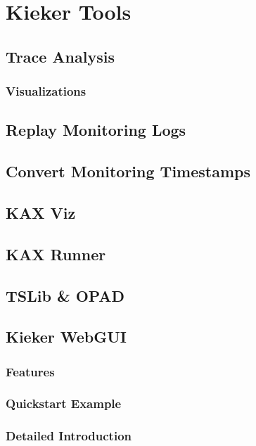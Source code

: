 \chapter{Kieker Tools}\label{chp:Kieker-Tools}
	\section{Trace Analysis}
		\subsection{Visualizations}
	\section{Replay Monitoring Logs}
	\section{Convert Monitoring Timestamps}
	\section{KAX Viz}
	\section{KAX Runner}
	\section{TSLib \& OPAD}
	
	\section{Kieker WebGUI}\label{chp:Kieker-WebGUI}
		\subsection{Features}
		\subsection{Quickstart Example}
		\subsection{Detailed Introduction}